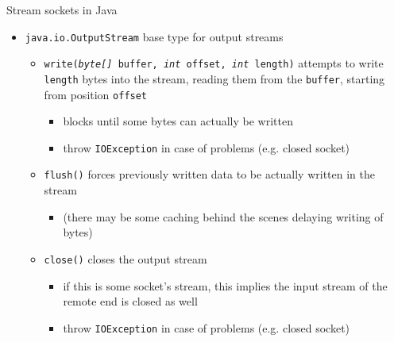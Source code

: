 \documentclass[presentation]{beamer}\mode<presentation>{\usetheme{AMSBolognaFC}}
\begin{document}
\begin{frame}[c, allowframebreaks]{Stream sockets in Java}
\begin{itemize}
        \item \texttt{java.io.\alert{OutputStream}} base type for output streams 
        \begin{itemize}
            \item \alert{\texttt{write(\textit{byte[]} buffer, \textit{int} offset, \textit{int} length)}} attempts to write \texttt{length} bytes into the stream, reading them from the \texttt{buffer}, starting from position \texttt{offset}
            \begin{itemize}
                \item blocks until some bytes can actually be written
                \item throw \texttt{IOException} in case of problems (e.g. closed socket)
            \end{itemize}
            \item \alert{\texttt{flush()}} forces previously written data to be actually written in the stream
            \begin{itemize}
                \item (there may be some caching behind the scenes delaying writing of bytes)
            \end{itemize}
            \item \alert{\texttt{close()}} closes the output stream
            \begin{itemize}
                \item if this is some socket's stream, this implies the input stream of the remote end is closed as well
                \item throw \texttt{IOException} in case of problems (e.g. closed socket)
            \end{itemize}
        \end{itemize}

    \end{itemize}

\end{frame}
\end{document}
